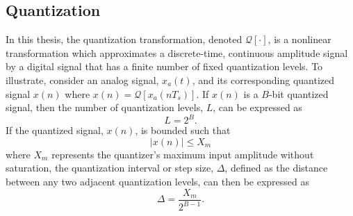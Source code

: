 \subsection{Quantization}
In this thesis, the quantization transformation, denoted $\mathcal{Q}[\cdot]$, is a
nonlinear transformation which approximates a discrete-time, continuous amplitude
signal by a digital signal that has a finite number of fixed quantization levels. To
illustrate, consider an analog signal, $x_a(t)$, and its corresponding quantized 
signal $x(n)$ where $x(n)=\mathcal{Q}\left[x_a(nT_s)\right]$. If $x(n)$ is a
$B$-bit quantized signal, then the number of quantization
levels, $L$, can be expressed as
\begin{equation}\label{eq:quantization_bits}
 L=2^B\text{.}
\end{equation}
If the quantized signal, $x(n)$, is bounded such that
\begin{equation}\label{eq:quant_magnitude}
\bigl|x(n)\bigr|\leq X_m
\end{equation}
where $X_m$ represents the quantizer's maximum input amplitude without saturation, the
quantization interval or step size, $\Delta$, defined as the distance between any two
adjacent quantization levels, can then be expressed as 
\begin{equation}\label{eq:quantization_delta}
 \Delta=\frac{X_m}{2^{B-1}}\text{.}
\end{equation}

